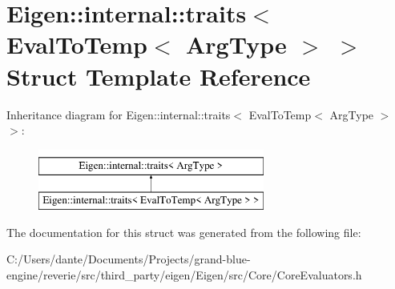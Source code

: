 \hypertarget{struct_eigen_1_1internal_1_1traits_3_01_eval_to_temp_3_01_arg_type_01_4_01_4}{}\section{Eigen\+::internal\+::traits$<$ Eval\+To\+Temp$<$ Arg\+Type $>$ $>$ Struct Template Reference}
\label{struct_eigen_1_1internal_1_1traits_3_01_eval_to_temp_3_01_arg_type_01_4_01_4}
Inheritance diagram for Eigen\+::internal\+::traits$<$ Eval\+To\+Temp$<$ Arg\+Type $>$ $>$\+:\begin{figure}[H]
\begin{center}
\leavevmode
\includegraphics[height=2.000000cm]{struct_eigen_1_1internal_1_1traits_3_01_eval_to_temp_3_01_arg_type_01_4_01_4}
\end{center}
\end{figure}


The documentation for this struct was generated from the following file\+:\begin{DoxyCompactItemize}
\item 
C\+:/\+Users/dante/\+Documents/\+Projects/grand-\/blue-\/engine/reverie/src/third\+\_\+party/eigen/\+Eigen/src/\+Core/Core\+Evaluators.\+h\end{DoxyCompactItemize}
